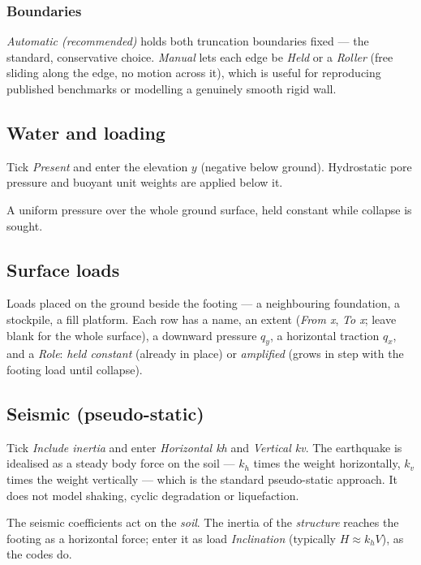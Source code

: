 \documentclass[11pt,a4paper]{article}
\newcommand{\field}[1]{\textsf{\textit{#1}}}
\begin{document}
\subsubsection{Boundaries}
\field{Automatic (recommended)} holds both truncation boundaries fixed --- the standard, conservative choice. \field{Manual} lets each edge be \field{Held} or a \field{Roller} (free sliding along the edge, no motion across it), which is useful for reproducing published benchmarks or modelling a genuinely smooth rigid wall.

\subsection{Water and loading}
\begin{description}[style=nextline]
  \item[Water table] Tick \field{Present} and enter the elevation $y$ (negative below ground). Hydrostatic pore pressure and buoyant unit weights are applied below it.
  \item[Surface surcharge] A uniform pressure over the whole ground surface, held constant while collapse is sought.
\end{description}

\subsection{Surface loads}
Loads placed on the ground beside the footing --- a neighbouring foundation, a stockpile, a fill platform. Each row has a name, an extent (\field{From x}, \field{To x}; leave blank for the whole surface), a downward pressure $q_y$, a horizontal traction $q_x$, and a \field{Role}: \field{held constant} (already in place) or \field{amplified} (grows in step with the footing load until collapse).

\subsection{Seismic (pseudo-static)}
Tick \field{Include inertia} and enter \field{Horizontal kh} and \field{Vertical kv}. The earthquake is idealised as a steady body force on the soil --- $k_h$ times the weight horizontally, $k_v$ times the weight vertically --- which is the standard pseudo-static approach. It does not model shaking, cyclic degradation or liquefaction.

\begin{note}
The seismic coefficients act on the \emph{soil}. The inertia of the \emph{structure} reaches the footing as a horizontal force; enter it as load \field{Inclination} (typically $H \approx k_h V$), as the codes do.
\end{note}
\end{document}
